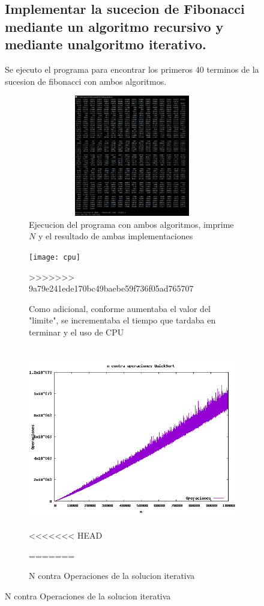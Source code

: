 \documentclass[spanish]{article}
\begin{document}
\begin{figure}[h!]
	\subsection{Implementar la sucecion de Fibonacci mediante un algoritmo recursivo y mediante unalgoritmo iterativo.}
	Se ejecuto el programa para encontrar los primeros 40 terminos de la sucesion de fibonacci con ambos algoritmos.			
	\begin{figure}[h!]
		\centering
		\includegraphics[width=400px,height=200px]{ejecucionPrimeraParte}
		\caption{Ejecucion del programa con ambos algoritmos, imprime $N$ y el resultado de ambas implementaciones}
	\end{figure}
	\begin{figure}[H]
		\centering
		\texttt{[image: cpu]}
		\caption{Como adicional, conforme aumentaba el valor del "limite", se incrementaba el tiempo que tardaba en terminar y el uso de CPU}
>>>>>>> 9a79e241ede170bc49baebe59f736f05ad765707
	\end{figure}
	\begin{figure}[H]
		\centering
		\includegraphics[width=400px,height=300px]{grafica1}
<<<<<<< HEAD
		\caption{N contra Operaciones de la funcion QuickSort en arreglos generados de forma aleatoria}
=======
		\caption{N contra Operaciones de la solucion iterativa}

\end{figure}
\end{figure}
\end{document}

